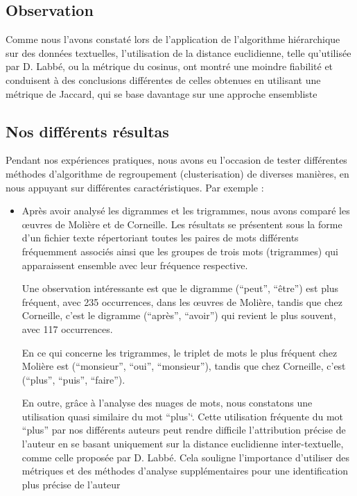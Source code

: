 \documentclass[]{report}
\begin{document}
\subsection{Observation}
Comme nous l'avons constaté lors de l'application de l'algorithme hiérarchique
sur des données textuelles, l'utilisation de la distance euclidienne, telle
qu'utilisée par D. Labbé, ou la métrique du cosinus, ont montré une moindre
fiabilité et conduisent à des conclusions différentes de celles obtenues en
utilisant une métrique de Jaccard, qui se base davantage sur une approche
ensembliste 

\subsection{Nos différents résultas}
Pendant nos expériences pratiques, nous avons eu l'occasion de tester
différentes méthodes d'algorithme de regroupement (clusterisation) de diverses
manières, en nous appuyant sur différentes caractéristiques. Par exemple :

\begin{itemize}
\item Après avoir analysé les digrammes et les trigrammes, nous avons comparé
les œuvres de Molière et de Corneille. Les résultats se présentent sous la forme
d'un fichier texte répertoriant toutes les paires de mots différents fréquemment
associés ainsi que les groupes de trois mots (trigrammes) qui apparaissent
ensemble avec leur fréquence respective.
	
Une observation intéressante est que le digramme (``peut'', ``être'') est plus
fréquent, avec 235 occurrences, dans les œuvres de Molière, tandis que chez
Corneille, c'est le digramme (``après'', ``avoir'') qui revient le plus souvent,
avec 117 occurrences.
	
En ce qui concerne les trigrammes, le triplet de mots le plus fréquent chez
Molière est (``monsieur'', ``oui'', ``monsieur''), tandis que chez Corneille,
c'est (``plus'', ``puis'', ``faire'').

	En outre, grâce à l'analyse des nuages de mots, nous constatons une
	utilisation quasi similaire du mot ``plus'`. Cette utilisation fréquente du mot
	``plus'' par nos différents auteurs peut rendre difficile l'attribution précise de
	l'auteur en se basant uniquement sur la distance euclidienne inter-textuelle,
	comme celle proposée par D. Labbé. Cela souligne l'importance d'utiliser des
	métriques et des méthodes d'analyse supplémentaires pour une identification
	plus précise de l'auteur

\end{itemize}
\end{document}
